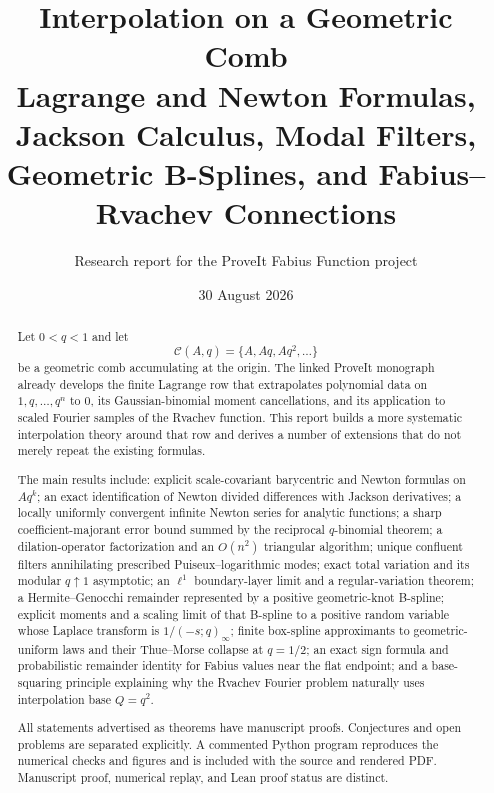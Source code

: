 \documentclass[11pt,oneside]{article}
\title{\textbf{Interpolation on a Geometric Comb}\\[0.45em]
\large Lagrange and Newton Formulas, Jackson Calculus, Modal Filters,\\
Geometric B-Splines, and Fabius--Rvachev Connections}
\author{Research report for the ProveIt Fabius Function project}
\date{30 August 2026}
\numberwithin{equation}{section}
\theoremstyle{definition}
\theoremstyle{remark}
\newcommand{\Cc}{\mathcal C}
\begin{document}
\maketitle

\begin{abstract}
Let $0<q<1$ and let
\[
  \Cc(A,q)=\{A,Aq,Aq^2,\ldots\}
\]
be a geometric comb accumulating at the origin.  The linked ProveIt monograph
already develops the finite Lagrange row that extrapolates polynomial data on
$1,q,\ldots,q^n$ to $0$, its Gaussian-binomial moment cancellations, and its
application to scaled Fourier samples of the Rvachev function.  This report
builds a more systematic interpolation theory around that row and derives a
number of extensions that do not merely repeat the existing formulas.

The main results include: explicit scale-covariant barycentric and Newton
formulas on $Aq^k$; an exact identification of Newton divided differences with
Jackson derivatives; a locally uniformly convergent infinite Newton series for
analytic functions; a sharp coefficient-majorant error bound summed by the
reciprocal $q$-binomial theorem; a dilation-operator factorization and an
$O(n^2)$ triangular algorithm; unique confluent filters annihilating prescribed
Puiseux--logarithmic modes; exact total variation and its modular $q\uparrow1$
asymptotic; an $\ell^1$ boundary-layer limit and a regular-variation theorem;
a Hermite--Genocchi remainder represented by a positive geometric-knot
B-spline; explicit moments and a scaling limit of that B-spline to a positive
random variable whose Laplace transform is $1/(-s;q)_\infty$; finite box-spline
approximants to geometric-uniform laws and their Thue--Morse collapse at
$q=1/2$; an exact sign formula and probabilistic remainder identity for Fabius
values near the flat endpoint; and a base-squaring principle explaining why the
Rvachev Fourier problem naturally uses interpolation base $Q=q^2$.

All statements advertised as theorems have manuscript proofs.  Conjectures and
open problems are separated explicitly.  A commented Python program reproduces
the numerical checks and figures and is included with the source and rendered
PDF.  Manuscript proof, numerical replay, and Lean proof status are distinct.
\end{abstract}
\end{document}
